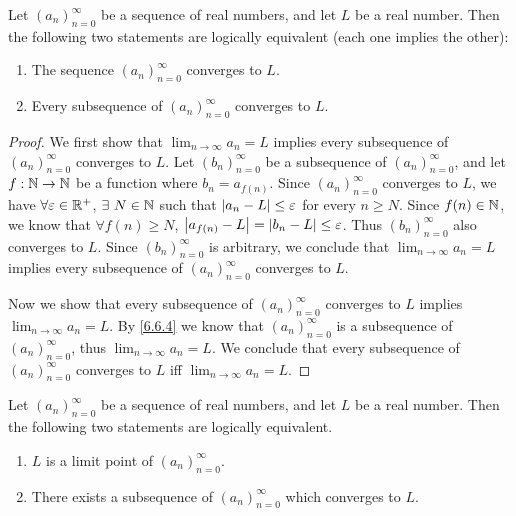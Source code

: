 \begin{prop}\label{6.6.5}
  Let \((a_n)_{n = 0}^\infty\) be a sequence of real numbers, and let \(L\) be a real number.
  Then the following two statements are logically equivalent (each one implies the other):
  \begin{enumerate}
    \item The sequence \((a_n)_{n = 0}^\infty\) converges to \(L\).
    \item Every subsequence of \((a_n)_{n = 0}^\infty\) converges to \(L\).
  \end{enumerate}
\end{prop}

\begin{proof}
  We first show that \(\lim_{n \to \infty} a_n = L\) implies every subsequence of \((a_n)_{n = 0}^\infty\) converges to \(L\).
  Let \((b_n)_{n = 0}^\infty\) be a subsequence of \((a_n)_{n = 0}^\infty\), and let \(f : \mathbb{N} \to \mathbb{N}\) be a function where \(b_n = a_{f(n)}\).
  Since \((a_n)_{n = 0}^\infty\) converges to \(L\), we have \(\forall \varepsilon \in \mathbb{R}^+\), \(\exists\ N \in \mathbb{N}\) such that \(\left\lvert a_n - L\right\rvert \leq \varepsilon\) for every \(n \geq N\).
  Since \(f(n) \in \mathbb{N}\), we know that \(\forall f(n) \geq N\), \(\left\lvert a_{f(n)} - L\right\rvert = \left\lvert b_n - L\right\rvert \leq \varepsilon\).
  Thus \((b_n)_{n = 0}^\infty\) also converges to \(L\).
  Since \((b_n)_{n = 0}^\infty\) is arbitrary, we conclude that \(\lim_{n \to \infty} a_n = L\) implies every subsequence of \((a_n)_{n = 0}^\infty\) converges to \(L\).

  Now we show that every subsequence of \((a_n)_{n = 0}^\infty\) converges to \(L\) implies \(\lim_{n \to \infty} a_n = L\).
  By \cref{6.6.4} we know that \((a_n)_{n = 0}^\infty\) is a subsequence of \((a_n)_{n = 0}^\infty\), thus \(\lim_{n \to \infty} a_n = L\).
  We conclude that every subsequence of \((a_n)_{n = 0}^\infty\) converges to \(L\) iff \(\lim_{n \to \infty} a_n = L\).
\end{proof}

\begin{prop}\label{6.6.6}
  Let \((a_n)_{n = 0}^\infty\) be a sequence of real numbers, and let \(L\) be a real number.
  Then the following two statements are logically equivalent.
  \begin{enumerate}
    \item \(L\) is a limit point of \((a_n)_{n = 0}^\infty\).
    \item There exists a subsequence of \((a_n)_{n = 0}^\infty\) which converges to \(L\).
  \end{enumerate}
\end{prop}


